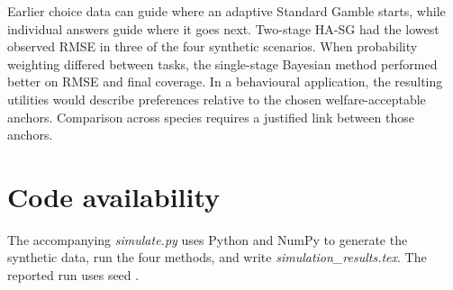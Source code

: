 \documentclass[11pt,a4paper]{article}
\begin{document}
Earlier choice data can guide where an adaptive Standard Gamble starts, while individual answers guide where it goes next. Two-stage HA-SG had the lowest observed RMSE in three of the four synthetic scenarios. When probability weighting differed between tasks, the single-stage Bayesian method performed better on RMSE and final coverage. In a behavioural application, the resulting utilities would describe preferences relative to the chosen welfare-acceptable anchors. Comparison across species requires a justified link between those anchors.

\section*{Code availability}
The accompanying \emph{simulate.py} uses Python and NumPy to generate the synthetic data, run the four methods, and write \emph{simulation\_results.tex}. The reported run uses seed \SimSeed.



\end{document}
